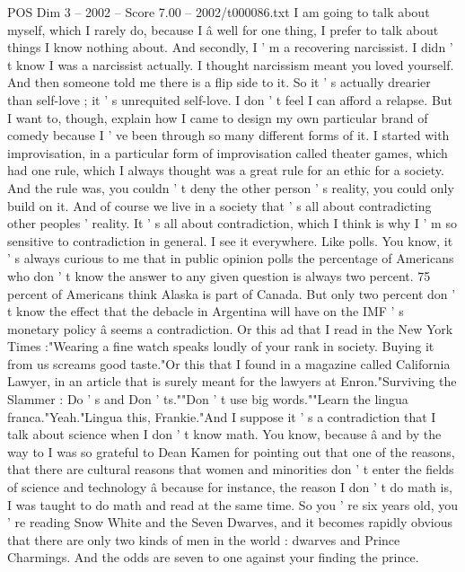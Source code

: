 \begin{textsample}{POS Dim 3 – 2002 – Score 7.00 – 2002/t000086.txt}  \label{ex:f3_pos_075}
I am going to talk about myself, which I rarely do, because I â well for one thing, I prefer to talk about things I know nothing about.
And secondly, I ' m a recovering narcissist.
I didn ' t know I was a narcissist actually.
I thought narcissism meant you loved yourself.
And then someone told me there is a flip side to it.
So it ' s actually drearier than self-love ; it ' s unrequited self-love.
I don ' t feel I can afford a relapse.
But I want to, though, explain how I came to design my own particular brand of comedy because I ' ve been through so many different forms of it.
I started with improvisation, in a particular form of improvisation called theater games, which had one rule, which I always thought was a great rule for an ethic for a society.
And the rule was, you couldn ' t deny the other person ' s reality, you could only build on it.
And of course we live in a society that ' s all about contradicting other peoples ' reality.
It ' s all about contradiction, which I think is why I ' m so sensitive to contradiction in general.
I see it everywhere.
Like polls.
You know, it ' s always curious to me that in public opinion polls the percentage of Americans who don ' t know the answer to any given question is always two percent. 75 percent of Americans think Alaska is part of Canada.
But only two percent don ' t know the effect that the debacle in Argentina will have on the IMF ' s monetary policy â seems a contradiction.
Or this ad that I read in the New York Times :"Wearing a fine watch speaks loudly of your rank in society.
Buying it from us screams good taste."Or this that I found in a magazine called California Lawyer, in an article that is surely meant for the lawyers at Enron."Surviving the Slammer : Do ' s and Don ' ts.""Don ' t use big words.""Learn the lingua franca."Yeah."Lingua this, Frankie."And I suppose it ' s a contradiction that I talk about science when I don ' t know math.
You know, because â and by the way to I was so grateful to Dean Kamen for pointing out that one of the reasons, that there are cultural reasons that women and minorities don ' t enter the fields of science and technology â because for instance, the reason I don ' t do math is, I was taught to do math and read at the same time.
So you ' re six years old, you ' re reading Snow White and the Seven Dwarves, and it becomes rapidly obvious that there are only two kinds of men in the world : dwarves and Prince Charmings.
And the odds are seven to one against your finding the prince.

\end{textsample}

